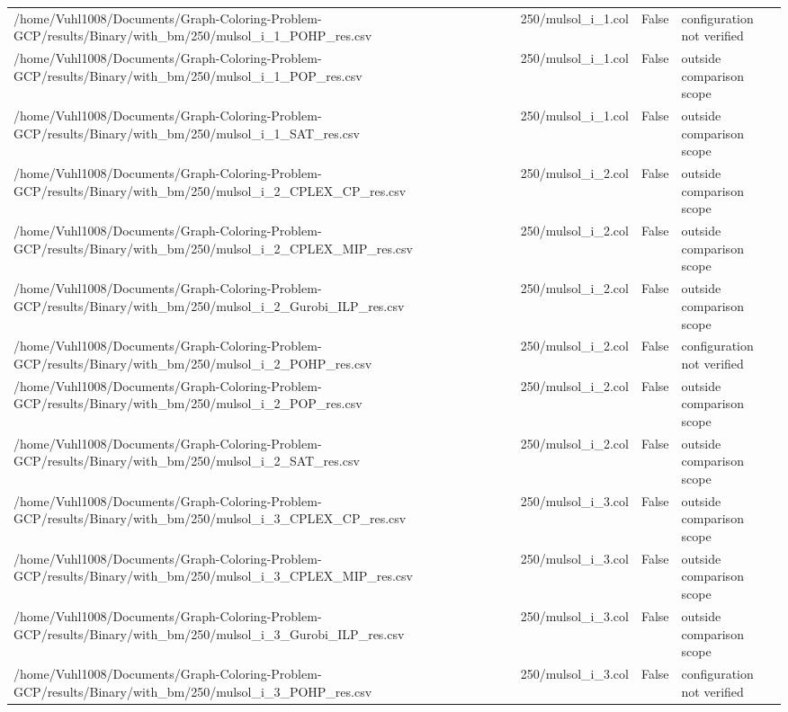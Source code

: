 \begin{table}[htbp]
\begin{tabular}{llll}
/home/Vuhl1008/Documents/Graph-Coloring-Problem-GCP/results/Binary/with\_bm/250/mulsol\_i\_1\_POHP\_res.csv & 250/mulsol\_i\_1.col & False & configuration not verified \\
/home/Vuhl1008/Documents/Graph-Coloring-Problem-GCP/results/Binary/with\_bm/250/mulsol\_i\_1\_POP\_res.csv & 250/mulsol\_i\_1.col & False & outside comparison scope \\
/home/Vuhl1008/Documents/Graph-Coloring-Problem-GCP/results/Binary/with\_bm/250/mulsol\_i\_1\_SAT\_res.csv & 250/mulsol\_i\_1.col & False & outside comparison scope \\
/home/Vuhl1008/Documents/Graph-Coloring-Problem-GCP/results/Binary/with\_bm/250/mulsol\_i\_2\_CPLEX\_CP\_res.csv & 250/mulsol\_i\_2.col & False & outside comparison scope \\
/home/Vuhl1008/Documents/Graph-Coloring-Problem-GCP/results/Binary/with\_bm/250/mulsol\_i\_2\_CPLEX\_MIP\_res.csv & 250/mulsol\_i\_2.col & False & outside comparison scope \\
/home/Vuhl1008/Documents/Graph-Coloring-Problem-GCP/results/Binary/with\_bm/250/mulsol\_i\_2\_Gurobi\_ILP\_res.csv & 250/mulsol\_i\_2.col & False & outside comparison scope \\
/home/Vuhl1008/Documents/Graph-Coloring-Problem-GCP/results/Binary/with\_bm/250/mulsol\_i\_2\_POHP\_res.csv & 250/mulsol\_i\_2.col & False & configuration not verified \\
/home/Vuhl1008/Documents/Graph-Coloring-Problem-GCP/results/Binary/with\_bm/250/mulsol\_i\_2\_POP\_res.csv & 250/mulsol\_i\_2.col & False & outside comparison scope \\
/home/Vuhl1008/Documents/Graph-Coloring-Problem-GCP/results/Binary/with\_bm/250/mulsol\_i\_2\_SAT\_res.csv & 250/mulsol\_i\_2.col & False & outside comparison scope \\
/home/Vuhl1008/Documents/Graph-Coloring-Problem-GCP/results/Binary/with\_bm/250/mulsol\_i\_3\_CPLEX\_CP\_res.csv & 250/mulsol\_i\_3.col & False & outside comparison scope \\
/home/Vuhl1008/Documents/Graph-Coloring-Problem-GCP/results/Binary/with\_bm/250/mulsol\_i\_3\_CPLEX\_MIP\_res.csv & 250/mulsol\_i\_3.col & False & outside comparison scope \\
/home/Vuhl1008/Documents/Graph-Coloring-Problem-GCP/results/Binary/with\_bm/250/mulsol\_i\_3\_Gurobi\_ILP\_res.csv & 250/mulsol\_i\_3.col & False & outside comparison scope \\
/home/Vuhl1008/Documents/Graph-Coloring-Problem-GCP/results/Binary/with\_bm/250/mulsol\_i\_3\_POHP\_res.csv & 250/mulsol\_i\_3.col & False & configuration not verified \\

\end{tabular}
\end{table}
